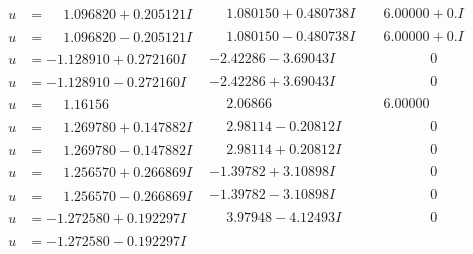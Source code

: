 \documentclass[1p]{elsarticle_modified}
\theoremstyle{definition}
\begin{document}
$$\begin{array}{c|c|c}
\begin{aligned}
u &= \phantom{-}1.096820 + 0.205121 I\end{aligned}
 & \phantom{-}1.080150 + 0.480738 I & \phantom{-}6.00000 + 0. I\phantom{ +0.000000I} \\ \hline\begin{aligned}
u &= \phantom{-}1.096820 - 0.205121 I\end{aligned}
 & \phantom{-}1.080150 - 0.480738 I & \phantom{-}6.00000 + 0. I\phantom{ +0.000000I} \\ \hline\begin{aligned}
u &= -1.128910 + 0.272160 I\end{aligned}
 & -2.42286 - 3.69043 I & \phantom{-0.000000 } 0 \\ \hline\begin{aligned}
u &= -1.128910 - 0.272160 I\end{aligned}
 & -2.42286 + 3.69043 I & \phantom{-0.000000 } 0 \\ \hline\begin{aligned}
u &= \phantom{-}1.16156\phantom{ +0.000000I}\end{aligned}
 & \phantom{-}2.06866\phantom{ +0.000000I} & \phantom{-}6.00000\phantom{ +0.000000I} \\ \hline\begin{aligned}
u &= \phantom{-}1.269780 + 0.147882 I\end{aligned}
 & \phantom{-}2.98114 - 0.20812 I & \phantom{-0.000000 } 0 \\ \hline\begin{aligned}
u &= \phantom{-}1.269780 - 0.147882 I\end{aligned}
 & \phantom{-}2.98114 + 0.20812 I & \phantom{-0.000000 } 0 \\ \hline\begin{aligned}
u &= \phantom{-}1.256570 + 0.266869 I\end{aligned}
 & -1.39782 + 3.10898 I & \phantom{-0.000000 } 0 \\ \hline\begin{aligned}
u &= \phantom{-}1.256570 - 0.266869 I\end{aligned}
 & -1.39782 - 3.10898 I & \phantom{-0.000000 } 0 \\ \hline\begin{aligned}
u &= -1.272580 + 0.192297 I\end{aligned}
 & \phantom{-}3.97948 - 4.12493 I & \phantom{-0.000000 } 0 \\ \hline\begin{aligned}
u &= -1.272580 - 0.192297 I\end{aligned}

\end{array}$$
\end{document}
